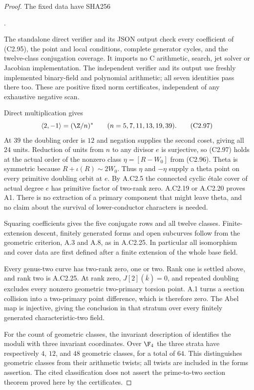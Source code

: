\begin{proof}
The fixed data have SHA256
\begin{center}
.
\end{center}
The standalone direct verifier
and its JSON output check every coefficient
of (C2.95), the point and local conditions,
complete generator cycles, and the
twelve-class conjugation coverage.
It imports no C arithmetic, search,
jet solver or Jacobian implementation.
The independent verifier
and its output use freshly implemented
binary-field and polynomial arithmetic;
all seven identities pass there too.
These are positive fixed norm certificates,
independent of any exhaustive negative scan.

Direct multiplication gives
\[
                 \langle2,-1\rangle=(\Z/n)^*
       \qquad(n=5,7,11,13,19,39).                           \tag{C2.97}
\]
At $39$ the doubling order is $12$ and
negation supplies the second coset, giving
all $24$ units. Reduction of units from
$n$ to any divisor $e$ is surjective, so
(C2.97) holds at the actual order of the
nonzero class $\eta=[R-W_0]$ from (C2.96).
Theta is symmetric because
$R+\iota(R)\sim2W_0$. Thus $\eta$ and
$-\eta$ supply a theta point on every
primitive doubling orbit at $e$.
By A.C2.5 the connected cyclic \'etale
cover of actual degree $e$ has primitive
factor of two-rank zero. A.C2.19 or
A.C2.20 proves A1. There is no extraction
of a primary component that might leave
theta, and no claim about the survival
of lower-conductor characters is needed.

Squaring coefficients gives the five
conjugate rows and all twelve classes.
Finite-extension descent, finitely
generated forms and open subcurves follow
from the geometric criterion, A.3 and
A.8, as in A.C2.25. In particular all
isomorphism and cover data are first
defined after a finite extension of
the whole base field.

Every genus-two curve has two-rank
zero, one or two. Rank one is settled
above, and rank two is A.C2.25. At rank
zero, $J[2](\overline k)=0$, and repeated
doubling excludes every nonzero geometric
two-primary torsion point. A.1 turns a
section collision into a two-primary
point difference, which is therefore
zero. The Abel map is injective, giving
the conclusion in that stratum over
every finitely generated characteristic-two
field.

For the count of geometric classes,
the invariant description of
\citet[Theorem 20, author p.~19;
Theorem 22 and Corollary 23, author
p.~21]{A_CardonaNartPujolas2005}
identifies the moduli with three invariant
coordinates. Over $\F_4$ the three
strata have respectively $4$, $12$, and
$48$ geometric classes, for a total of
$64$. This distinguishes geometric
classes from their arithmetic twists;
all twists are included in the forms
assertion. The cited classification
does not assert the prime-to-two section
theorem proved here by the certificates.


\end{proof}

